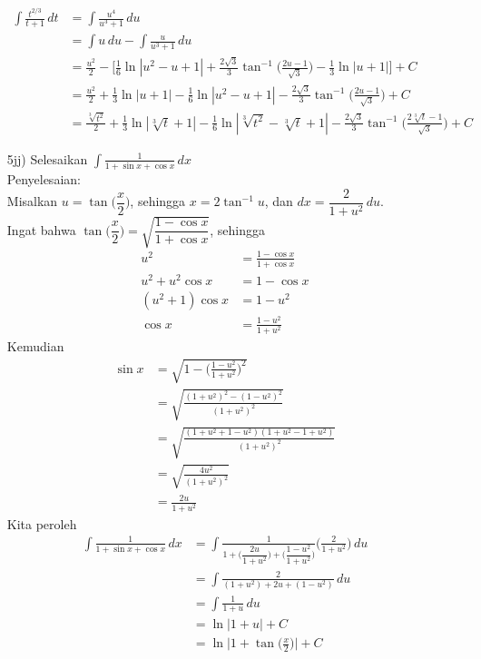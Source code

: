 \documentclass{article}
\begin{document}
\begin{enumerate}
\begin{align*}
	\int \frac{t^{2/3}}{t+1} \, dt &= \int \frac{u^4}{u^3+1} \, du \\
	&= \int u \, du - \int \frac{u}{u^3+1} \, du \\
	&= \frac{u^2}{2} - \bigg[\frac{1}{6}\ln|u^2-u+1|+\frac{2\sqrt{3}}{3} \tan^{-1}\Big(\frac{2u-1}{\sqrt{3}}\Big) - \frac{1}{3}\ln|u+1|\bigg] + C\\
	&= \frac{u^2}{2} +\frac{1}{3}\ln|u+1|-\frac{1}{6}\ln|u^2-u+1|-\frac{2\sqrt{3}}{3} \tan^{-1}\Big(\frac{2u-1}{\sqrt{3}}\Big) + C\\
	&= \frac{\sqrt[3]{t^2}}{2} +\frac{1}{3}\ln|\sqrt[3]{t}+1|-\frac{1}{6}\ln|\sqrt[3]{t^2}-\sqrt[3]{t}+1|-\frac{2\sqrt{3}}{3} \tan^{-1}\Big(\frac{2\sqrt[3]{t}-1}{\sqrt{3}}\Big) + C
	\end{align*}
	\item[5jj)] Selesaikan \(\displaystyle \int \frac{1}{1+\sin x+\cos x} \, dx\)\\
	Penyelesaian: \\
	Misalkan $u=\tan\Big(\dfrac{x}{2}\Big)$, sehingga $x=2\tan^{-1}u$, dan $dx=\dfrac{2}{1+u^2} \, du$. \\
	Ingat bahwa $\tan\Big(\dfrac{x}{2}\Big)=\sqrt{\dfrac{1-\cos x}{1+\cos x}}$, sehingga 
	\begin{align*}
	u^2 &= \frac{1-\cos x}{1+\cos x} \\
	u^2+u^2\cos x &= 1-\cos x \\
	(u^2+1)\cos x &= 1-u^2 \\
	\cos x &= \frac{1-u^2}{1+u^2}
	\end{align*}
	Kemudian
	\begin{align*}
	\sin x &= \sqrt{1-\bigg(\frac{1-u^2}{1+u^2}\bigg)^2} \\
	&= \sqrt{\frac{(1+u^2)^2-(1-u^2)^2}{(1+u^2)^2}} \\
	&= \sqrt{\frac{(1+u^2+1-u^2)(1+u^2-1+u^2)}{(1+u^2)^2}} \\
	&= \sqrt{\frac{4u^2}{{(1+u^2)^2}}} \\
	&= \frac{2u}{1+u^2}
	\end{align*}
	Kita peroleh 
	\begin{align*}
	\int \frac{1}{1+\sin x+\cos x} \, dx &= \int \frac{1}{1+\bigg(\dfrac{2u}{1+u^2}\bigg)+\bigg(\dfrac{1-u^2}{1+u^2}\bigg)} \bigg(\frac{2}{1+u^2}\bigg) \, du \\
	&= \int \frac{2}{(1+u^2)+2u+(1-u^2)} \, du \\
	&= \int \frac{1}{1+u} \, du \\
	&= \ln|1+u| + C \\
	&= \ln\Big|1+\tan\Big(\frac{x}{2}\Big)\Big| + C
	\end{align*}
\end{enumerate}
\end{document}
